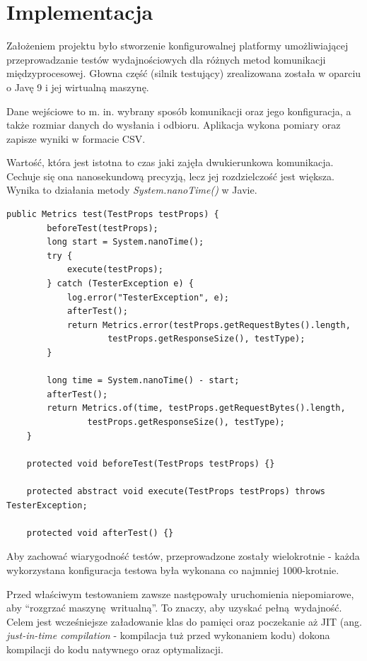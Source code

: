 \chapter{Implementacja}

Założeniem projektu było stworzenie konfigurowalnej platformy umożliwiającej przeprowadzanie testów wydajnościowych dla różnych metod komunikacji międzyprocesowej. Głowna część (silnik testujący) zrealizowana została w oparciu o Javę 9 i jej wirtualną maszynę.

Dane wejściowe to m. in. wybrany sposób komunikacji oraz jego konfiguracja, a także rozmiar danych do wysłania i odbioru. Aplikacja wykona pomiary oraz zapisze wyniki w formacie CSV.

Wartość, która jest istotna to czas jaki zajęła dwukierunkowa komunikacja. Cechuje się ona nanosekundową precyzją, lecz jej rozdzielczość jest większa. Wynika to działania metody \textit{System.nanoTime()} w Javie.

\begin{lstlisting}[caption={Metoda klasy abstrakcyjnej AbstractTransferTester, która jest wykorzysywana przez wszystkie sposoby komunikacji do wykonania pomiarów (implementowane/przeciążane są ostatnie 3 metody).},captionpos=b]
    public Metrics test(TestProps testProps) {
        beforeTest(testProps);
        long start = System.nanoTime();
        try {
            execute(testProps);
        } catch (TesterException e) {
            log.error("TesterException", e);
            afterTest();
            return Metrics.error(testProps.getRequestBytes().length,
                    testProps.getResponseSize(), testType);
        }

        long time = System.nanoTime() - start;
        afterTest();
        return Metrics.of(time, testProps.getRequestBytes().length,
                testProps.getResponseSize(), testType);
    }

    protected void beforeTest(TestProps testProps) {}

    protected abstract void execute(TestProps testProps) throws TesterException;

    protected void afterTest() {}
\end{lstlisting}


Aby zachować wiarygodność testów, przeprowadzone zostały wielokrotnie - każda wykorzystana konfiguracja testowa była wykonana co najmniej 1000-krotnie.

Przed właściwym testowaniem zawsze następowały uruchomienia niepomiarowe, aby \enquote{rozgrzać maszynę writualną}. To znaczy, aby uzyskać pełną wydajność. Celem jest wcześniejsze załadowanie klas do pamięci oraz poczekanie aż JIT (ang. \textit{just-in-time compilation} - kompilacja tuż przed wykonaniem kodu) dokona kompilacji do kodu natywnego oraz optymalizacji.

